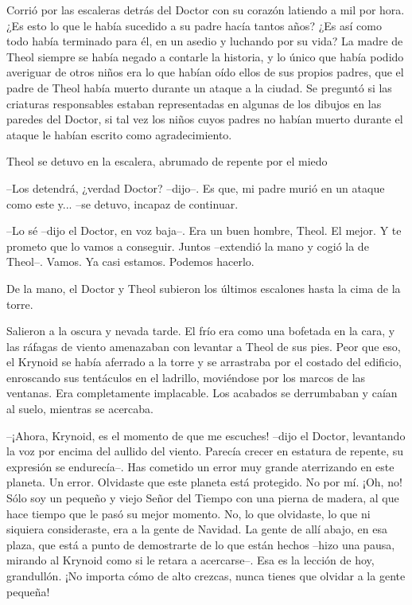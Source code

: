 Corrió por las escaleras detrás del Doctor con su corazón latiendo a mil por hora. ¿Es esto lo que le había sucedido a su padre hacía tantos años? ¿Es así como todo había terminado para él, en un asedio y luchando por su vida? La madre de Theol siempre se había negado a contarle la historia, y lo único que había podido averiguar de otros niños era lo que habían oído ellos de sus propios padres, que el padre de Theol había muerto durante un ataque a la ciudad. Se preguntó si las criaturas responsables estaban representadas en algunas de los dibujos en las paredes del Doctor, si tal vez los niños cuyos padres no habían muerto durante el ataque le habían escrito como agradecimiento.



Theol se detuvo en la escalera, abrumado de repente por el miedo 

--Los detendrá, ¿verdad Doctor? --dijo--. Es que, mi padre murió en un ataque como este y... --se detuvo, incapaz de continuar.



--Lo sé --dijo el Doctor, en voz baja--. Era un buen hombre, Theol. El mejor. Y te prometo que lo vamos a conseguir. Juntos --extendió la mano y cogió la de Theol--. Vamos. Ya casi estamos. Podemos hacerlo.



De la mano, el Doctor y Theol subieron los últimos escalones hasta la cima de la torre.



Salieron a la oscura y nevada tarde. El frío era como una bofetada en la cara, y las ráfagas de viento amenazaban con levantar a Theol de sus pies. Peor que eso, el Krynoid se había aferrado a la torre y se arrastraba por el costado del edificio, enroscando sus tentáculos en el ladrillo, moviéndose por los marcos de las ventanas. Era completamente implacable. Los acabados se derrumbaban y caían al suelo, mientras se acercaba.



--¡Ahora, Krynoid, es el momento de que me escuches! --dijo el Doctor, levantando la voz por encima del aullido del viento. Parecía crecer en estatura de repente, su expresión se endurecía--. Has cometido un error muy grande aterrizando en este planeta. Un error. Olvidaste que este planeta está protegido. No por mí. ¡Oh, no! Sólo soy un pequeño y viejo Señor del Tiempo con una pierna de madera, al que hace tiempo que le pasó su mejor momento. No, lo que olvidaste, lo que ni siquiera consideraste, era a la gente de Navidad. La gente de allí abajo, en esa plaza, que está a punto de demostrarte de lo que están hechos --hizo una pausa, mirando al Krynoid como si le retara a acercarse--. Esa es la lección de hoy, grandullón. ¡No importa cómo de alto crezcas, nunca tienes que olvidar a la gente pequeña!



